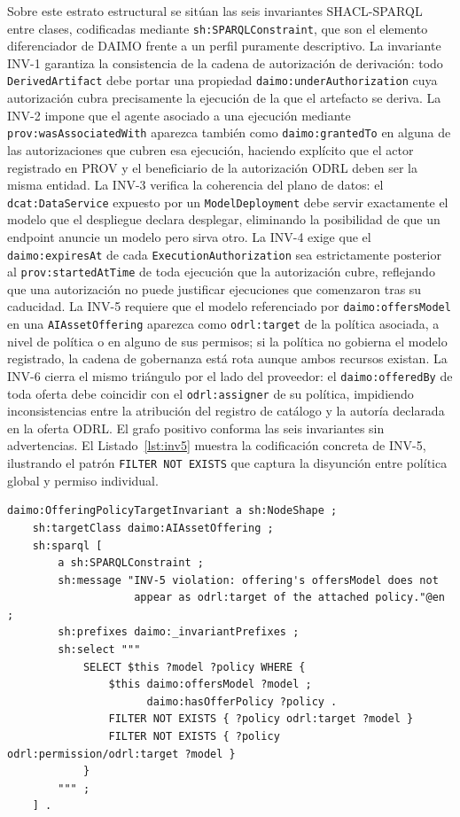 \documentclass[11pt,a4paper]{article}
\newcommand{\code}[1]{\texttt{#1}}
\begin{document}
Sobre este estrato estructural se sitúan las seis invariantes SHACL-SPARQL entre clases, codificadas mediante \code{sh:SPARQLConstraint}, que son el elemento diferenciador de DAIMO frente a un perfil puramente descriptivo. La invariante INV-1 garantiza la consistencia de la cadena de autorización de derivación: todo \code{DerivedArtifact} debe portar una propiedad \code{daimo:underAuthorization} cuya autorización cubra precisamente la ejecución de la que el artefacto se deriva. La INV-2 impone que el agente asociado a una ejecución mediante \code{prov:wasAssociatedWith} aparezca también como \code{daimo:grantedTo} en alguna de las autorizaciones que cubren esa ejecución, haciendo explícito que el actor registrado en PROV y el beneficiario de la autorización ODRL deben ser la misma entidad. La INV-3 verifica la coherencia del plano de datos: el \code{dcat:DataService} expuesto por un \code{ModelDeployment} debe servir exactamente el modelo que el despliegue declara desplegar, eliminando la posibilidad de que un endpoint anuncie un modelo pero sirva otro. La INV-4 exige que el \code{daimo:expiresAt} de cada \code{ExecutionAuthorization} sea estrictamente posterior al \code{prov:startedAtTime} de toda ejecución que la autorización cubre, reflejando que una autorización no puede justificar ejecuciones que comenzaron tras su caducidad. La INV-5 requiere que el modelo referenciado por \code{daimo:offersModel} en una \code{AIAssetOffering} aparezca como \code{odrl:target} de la política asociada, a nivel de política o en alguno de sus permisos; si la política no gobierna el modelo registrado, la cadena de gobernanza está rota aunque ambos recursos existan. La INV-6 cierra el mismo triángulo por el lado del proveedor: el \code{daimo:offeredBy} de toda oferta debe coincidir con el \code{odrl:assigner} de su política, impidiendo inconsistencias entre la atribución del registro de catálogo y la autoría declarada en la oferta ODRL. El grafo positivo conforma las seis invariantes sin advertencias. El Listado~\ref{lst:inv5} muestra la codificación concreta de INV-5, ilustrando el patrón \code{FILTER NOT EXISTS} que captura la disyunción entre política global y permiso individual.

\begin{lstlisting}[label=lst:inv5,caption={Invariante INV-5 como \code{sh:SPARQLConstraint}.}]
daimo:OfferingPolicyTargetInvariant a sh:NodeShape ;
    sh:targetClass daimo:AIAssetOffering ;
    sh:sparql [
        a sh:SPARQLConstraint ;
        sh:message "INV-5 violation: offering's offersModel does not
                    appear as odrl:target of the attached policy."@en ;
        sh:prefixes daimo:_invariantPrefixes ;
        sh:select """
            SELECT $this ?model ?policy WHERE {
                $this daimo:offersModel ?model ;
                      daimo:hasOfferPolicy ?policy .
                FILTER NOT EXISTS { ?policy odrl:target ?model }
                FILTER NOT EXISTS { ?policy odrl:permission/odrl:target ?model }
            }
        """ ;
    ] .
\end{lstlisting}
\end{document}
